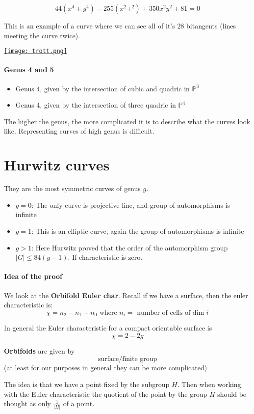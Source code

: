 \[44(x^4+y^4)-255(x^2+^2)+350x^2y^2+81 = 0\]

This is an example of a curve where we can see all of it's $28$ bitangents (lines meeting the curve twice).

\href{https://en.wikipedia.org/wiki/Bitangents_of_a_quartic}{\texttt{[image: trott.png]}}

\paragraph*{Genus 4 and 5}
\begin{itemize}
    \item Genus $4$, given by the intersection of cubic and quadric in $\mathbb{P}^3$
    \item Genus $4$, given by the intersection of three quadric in $\mathbb{P}^4$
\end{itemize}

The higher the genus, the more complicated it is to describe what the curves look like. Representing curves of high genus is difficult.

\section{Hurwitz curves}
They are the most symmetric curves of genus $g$.\begin{itemize}
    \item $g = 0$: The only curve is projective line, and group of automorphisms is infinite
    \item $g = 1$: This is an elliptic curve, again the group of automorphisms is infinite 
    \item $g > 1$: Here Hurwitz proved that the order of the automorphism group $|G|\leq 84(g-1)$. If characteristic is zero.
\end{itemize}

\paragraph*{Idea of the proof}
We look at the \textbf{Orbifold Euler char}. Recall if we have a surface, then the euler characteristic is: \[\chi = n_2-n_1+n_0 \text{ where }n_i = \text{ number of cells of dim }i\]

In general the Euler characteristic for a compact orientable surface is \[\chi = 2-2g\]

\begin{definition}
    \textbf{Orbifolds} are given by \[\text{surface}/\text{finite group}\](at least for our purposes in general they can be more complicated)

    The idea is that we have a point fixed by the subgroup $H$. Then when working with the Euler characteristic the quotient of the point by the group $H$ should be thought as only $\frac{1}{|H|}$ of a point.
\end{definition}

